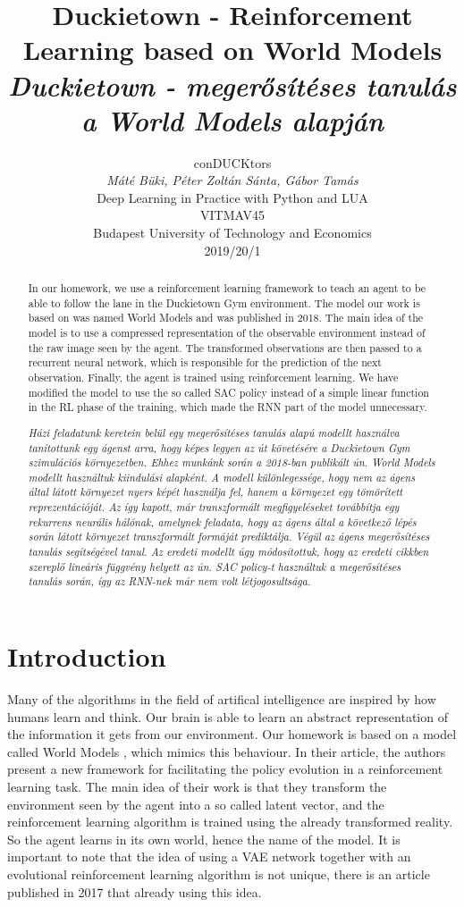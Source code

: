 \documentclass{article}
\title{Duckietown - Reinforcement Learning based on World Models\\ \textit{Duckietown - megerősítéses tanulás a World Models alapján}}
\author{%
  conDUCKtors\\
  \textit{Máté Büki, Péter Zoltán Sánta, Gábor Tamás}\\
  Deep Learning in Practice with Python and LUA\\
  VITMAV45\\
  Budapest University of Technology and Economics \\
  2019/20/1
}
\begin{document}
\maketitle

\begin{abstract}
In our homework, we use a reinforcement learning framework to teach an agent to be able to follow the lane in the Duckietown Gym environment. The model our work is based on was named World Models \cite{worldmodels} and was published in 2018. The main idea of the model is to use a compressed representation of the observable environment instead of the raw image seen by the agent. The transformed observations are then passed to a recurrent neural network, which is responsible for the prediction of the next observation. Finally, the agent is trained using reinforcement learning. We have modified the model to use the so called SAC policy instead of a simple linear function in the RL phase of the training, which made the RNN part of the model unnecessary.\newline

\textit{Házi feladatunk keretein belül egy megerősítéses tanulás alapú modellt használva tanítottunk egy ágenst arra, hogy képes legyen az út követésére a Duckietown Gym szimulációs környezetben. Ehhez munkánk során a 2018-ban publikált ún. World Models \cite{worldmodels} modellt használtuk kiindulási alapként. A modell különlegessége, hogy nem az ágens által látott környezet nyers képét használja fel, hanem a környezet egy tömörített reprezentációját. Az így kapott, már transzformált megfigyeléseket továbbítja egy rekurrens neurális hálónak, amelynek feladata, hogy az ágens által a következő lépés során látott környezet transzformált formáját prediktálja. Végül az ágens megerősítéses tanulás segítségével tanul. Az eredeti modellt úgy módosítottuk, hogy az eredeti cikkben szereplő lineáris függvény helyett az ún. SAC policy-t használtuk a megerősítéses tanulás során, így az RNN-nek már nem volt létjogosultsága.}
\end{abstract}

\section{Introduction}

Many of the algorithms in the field of artifical intelligence are inspired by how humans learn and think. Our brain is able to learn an abstract representation of the information it gets from our environment. Our homework is based on a model called World Models \cite{worldmodels}, which mimics this behaviour. In their article, the authors present a new framework for facilitating the policy evolution in a reinforcement learning \cite{rl} task. The main idea of their work is that they transform the environment seen by the agent into a so called latent vector, and the reinforcement learning algorithm is trained using the already transformed reality. So the agent learns in its own world, hence the name of the model. It is important to note that the idea of using a VAE network together with an evolutional reinforcement learning algorithm is not unique, there is an article \cite{vae_es} published in 2017 that already using this idea.
\end{document}
